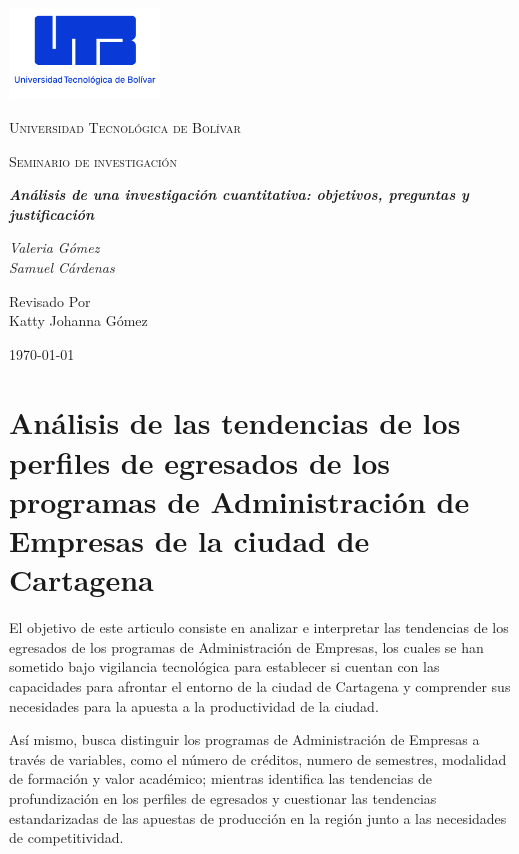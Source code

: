 \documentclass[letterpaper, 11pt]{report}
\begin{document}
\begin{titlepage}
      \centering
      \includegraphics[width=0.3\textwidth]{../../../images/logo_utb.png}\par\vspace{1cm}
      {\scshape\LARGE Universidad Tecnológica de Bolívar \par}
      \vspace{1cm}

      {\scshape\Large Seminario de investigación \par}
      \vspace{2cm}

      \slshape {\Large \bfseries{} Análisis de una investigación cuantitativa: objetivos, preguntas y justificación  \\}
      \vspace{3cm}

      \slshape {\itshape{} Valeria Gómez \\}
      \slshape {\itshape{} Samuel Cárdenas \\}

      \vfill
      Revisado Por \\
      Katty Johanna Gómez \\
      {\large \today\par}
\end{titlepage}

\nocite{*}

\section*{Análisis de las tendencias de los perfiles de egresados de los programas de Administración de Empresas de la ciudad de Cartagena}

El objetivo de este articulo consiste en analizar e interpretar las tendencias
de los egresados de los programas de Administración de Empresas, los cuales se
han sometido bajo vigilancia tecnológica para establecer si cuentan con las
capacidades para afrontar el entorno de la ciudad de Cartagena y comprender sus
necesidades para la apuesta a la productividad de la ciudad.

Así mismo, busca distinguir los programas de Administración de Empresas a
través de variables, como el número de créditos, numero de semestres, modalidad
de formación y valor académico; mientras identifica las tendencias de
profundización en los perfiles de egresados y cuestionar las tendencias
estandarizadas de las apuestas de producción en la región junto a las
necesidades de competitividad.
\end{document}
